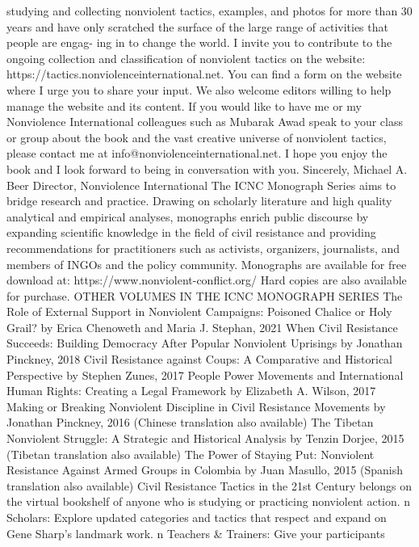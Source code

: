 \documentclass[twoside,a4paper,12pt,fleqn,openany]{extbook}
\begin{document}
studying and collecting nonviolent tactics, examples, and photos for more than 30 years
and have only scratched the surface of the large range of activities that people are engag-
ing in to change the world.
I invite you to contribute to the ongoing collection and classification of nonviolent tactics
on the website: https://tactics.nonviolenceinternational.net. You can find a form on the
website where I urge you to share your input. We also welcome editors willing to help
manage the website and its content.
If you would like to have me or my Nonviolence International colleagues such as Mubarak
Awad speak to your class or group about the book and the vast creative universe of
nonviolent tactics, please contact me at info@nonviolenceinternational.net.
I hope you enjoy the book and I look forward to being in conversation with you.
Sincerely,
Michael A. Beer
Director, Nonviolence International
The ICNC Monograph Series aims to bridge research and practice. Drawing on
scholarly literature and high quality analytical and empirical analyses, monographs
enrich public discourse by expanding scientific knowledge in the field of civil
resistance and providing recommendations for practitioners such as activists,
organizers, journalists, and members of INGOs and the policy community.
Monographs are available for free download at:
https://www.nonviolent-conflict.org/
Hard copies are also available for purchase.
OTHER VOLUMES IN THE ICNC MONOGRAPH SERIES
The Role of External Support in Nonviolent Campaigns:
Poisoned Chalice or Holy Grail?
by Erica Chenoweth and Maria J. Stephan, 2021
When Civil Resistance Succeeds: Building Democracy
After Popular Nonviolent Uprisings
by Jonathan Pinckney, 2018
Civil Resistance against Coups: A Comparative
and Historical Perspective
by Stephen Zunes, 2017
People Power Movements and International Human Rights:
Creating a Legal Framework
by Elizabeth A. Wilson, 2017
Making or Breaking Nonviolent Discipline in Civil Resistance Movements
by Jonathan Pinckney, 2016
(Chinese translation also available)
The Tibetan Nonviolent Struggle: A Strategic and Historical Analysis
by Tenzin Dorjee, 2015
(Tibetan translation also available)
The Power of Staying Put: Nonviolent Resistance
Against Armed Groups in Colombia
by Juan Masullo, 2015
(Spanish translation also available)
Civil Resistance Tactics in the 21st Century belongs on the virtual bookshelf
of anyone who is studying or practicing nonviolent action.
n Scholars: Explore updated categories and
tactics that respect and expand on Gene
Sharp's landmark work.
n Teachers & Trainers: Give your participants
\end{document}
